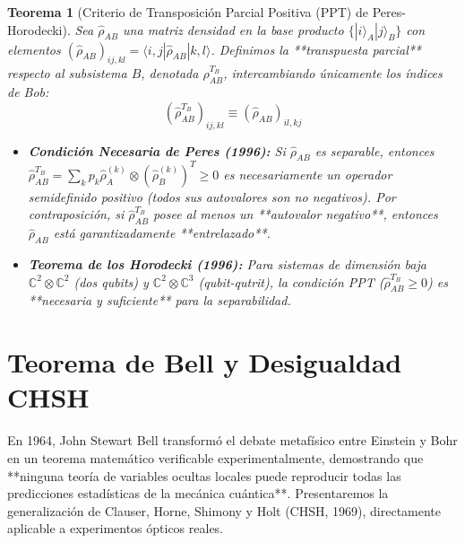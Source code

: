 \documentclass[11pt,a4paper]{book}
\newtheorem{teorema}{Teorema}[chapter]
\begin{document}
\begin{teorema}[Criterio de Transposición Parcial Positiva (PPT) de Peres-Horodecki]
Sea $\hat{\rho}_{AB}$ una matriz densidad en la base producto $\{|i\rangle_A |j\rangle_B\}$ con elementos $(\hat{\rho}_{AB})_{ij, kl} = \langle i, j | \hat{\rho}_{AB} | k, l \rangle$. Definimos la **transpuesta parcial** respecto al subsistema $B$, denotada $\hat{\rho}_{AB}^{T_B}$, intercambiando únicamente los índices de Bob:
\begin{equation}
\left(\hat{\rho}_{AB}^{T_B}\right)_{ij, kl} \equiv \left(\hat{\rho}_{AB}\right)_{il, kj}
\end{equation}
\begin{itemize}
    \item \textbf{Condición Necesaria de Peres (1996):} Si $\hat{\rho}_{AB}$ es separable, entonces $\hat{\rho}_{AB}^{T_B} = \sum_k p_k \hat{\rho}_A^{(k)} \otimes (\hat{\rho}_B^{(k)})^T \geq 0$ es necesariamente un operador semidefinido positivo (todos sus autovalores son no negativos). Por contraposición, si $\hat{\rho}_{AB}^{T_B}$ posee al menos un **autovalor negativo**, entonces $\hat{\rho}_{AB}$ está garantizadamente **entrelazado**.
    \item \textbf{Teorema de los Horodecki (1996):} Para sistemas de dimensión baja $\mathbb{C}^2 \otimes \mathbb{C}^2$ (dos qubits) y $\mathbb{C}^2 \otimes \mathbb{C}^3$ (qubit-qutrit), la condición PPT ($\hat{\rho}_{AB}^{T_B} \geq 0$) es **necesaria y suficiente** para la separabilidad.
\end{itemize}
\end{teorema}

\section[Teorema de Bell y desigualdad CHSH]{Teorema de Bell y Desigualdad CHSH}

En 1964, John Stewart Bell transformó el debate metafísico entre Einstein y Bohr en un teorema matemático verificable experimentalmente, demostrando que **ninguna teoría de variables ocultas locales puede reproducir todas las predicciones estadísticas de la mecánica cuántica**. Presentaremos la generalización de Clauser, Horne, Shimony y Holt (CHSH, 1969), directamente aplicable a experimentos ópticos reales.
\end{document}
